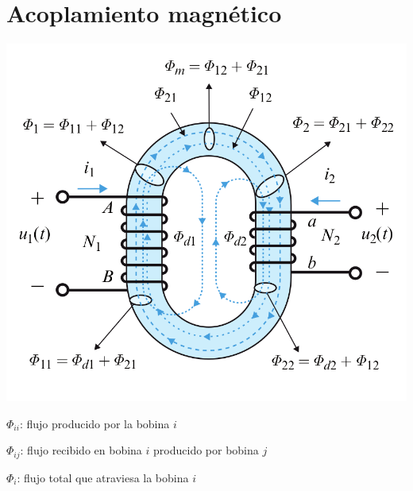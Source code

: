 \documentclass[xcolor={usenames,svgnames,dvipsnames}]{beamer}
\begin{document}
\section{Acoplamiento magnético}
\label{sec:org2bd5032}
\begin{frame}[label={sec:org8c40340},plain]{}
\begin{center}
\includegraphics[height=0.8\textheight]{figs/Acoplamiento1.png}
\end{center}

\(\Phi_{ii}\): flujo producido por la bobina \(i\)

\(\Phi_{ij}\): flujo recibido en bobina \(i\) producido por bobina \(j\)

\(\Phi_{i}\): flujo total que atraviesa la bobina \(i\)
\end{frame}
\end{document}
